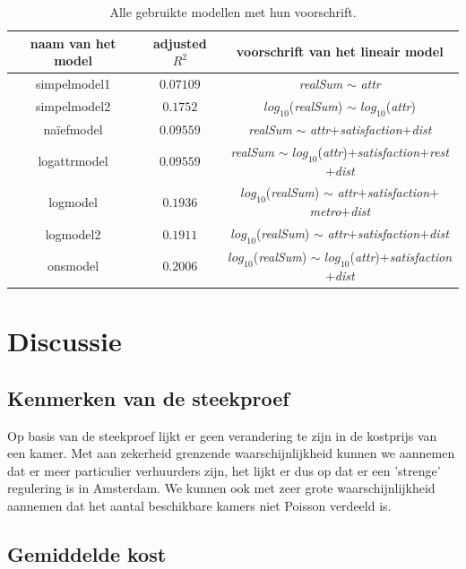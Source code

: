 \documentclass[a4paper]{kulakarticle}
\begin{document}
	
	
	\begin{table}[h]
		\centering
		\begin{tabular}{c|c|c}
		\centering
		naam van het model & adjusted $R^2$ & voorschrift van het lineair model \\
		\hline
		 simpelmodel1 & $0.07109$ & \textit{realSum} $\sim$ \textit{attr}\\
		 simpelmodel2 &$0.1752$ & $log_{10}$(\textit{realSum}) $\sim$ $log_{10}$(\textit{attr}) \\
		naïefmodel & $0.09559$& \textit{realSum} $\sim$ \textit{attr}$+$\textit{satisfaction}$+$\textit{dist}\\
		 logattrmodel &$0.09559$ & \textit{realSum} $\sim$ $log_{10}$(\textit{attr})$+$\textit{satisfaction}$+$\textit{rest}$+$\textit{dist}\\
		 logmodel &$0.1936$ & $log_{10}$(\textit{realSum}) $\sim$ \textit{attr}$+$\textit{satisfaction}$+$\textit{metro}$+$\textit{dist}\\
		 logmodel2 &$0.1911$ & $log_{10}$(\textit{realSum}) $\sim$ \textit{attr}$+$\textit{satisfaction}$+$\textit{dist}\\
		  onsmodel &$0.2006$ & $log_{10}$(\textit{realSum}) $\sim$ $log_{10}$(\textit{attr})$+$\textit{satisfaction}$+$\textit{dist}\\
		\end{tabular}
		\caption{Alle gebruikte modellen met hun voorschrift.}
		\label{rsq}
	\end{table}
	

	
	\section{Discussie}
	
	\subsection{Kenmerken van de steekproef}
Op basis van de steekproef lijkt er geen verandering te zijn in de kostprijs van een kamer. Met aan zekerheid grenzende waarschijnlijkheid kunnen we aannemen dat er meer particulier verhuurders zijn, het lijkt er dus op dat er een 'strenge' regulering is in Amsterdam. We kunnen ook met zeer grote waarschijnlijkheid aannemen dat het aantal beschikbare kamers niet Poisson verdeeld is.
	
	\subsection{Gemiddelde kost}
	
\end{document}

